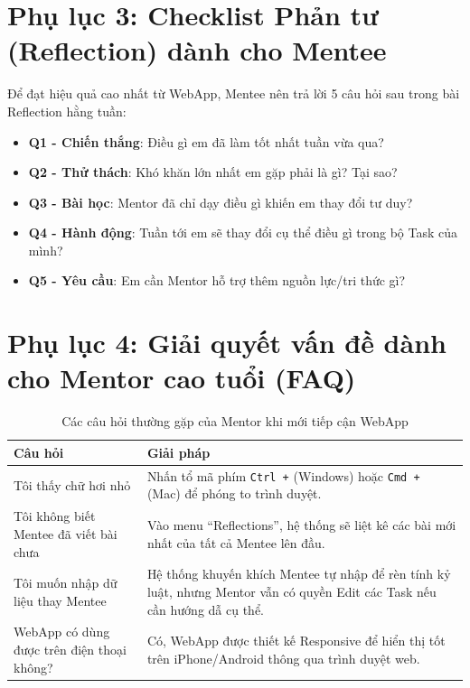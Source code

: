 \section*{Phụ lục 3: Checklist Phản tư (Reflection) dành cho Mentee}

Để đạt hiệu quả cao nhất từ WebApp, Mentee nên trả lời 5 câu hỏi sau trong bài Reflection hằng tuần:
\begin{itemize}
    \item \textbf{Q1 - Chiến thắng}: Điều gì em đã làm tốt nhất tuần vừa qua?
    \item \textbf{Q2 - Thử thách}: Khó khăn lớn nhất em gặp phải là gì? Tại sao?
    \item \textbf{Q3 - Bài học}: Mentor đã chỉ dạy điều gì khiến em thay đổi tư duy?
    \item \textbf{Q4 - Hành động}: Tuần tới em sẽ thay đổi cụ thể điều gì trong bộ Task của mình?
    \item \textbf{Q5 - Yêu cầu}: Em cần Mentor hỗ trợ thêm nguồn lực/tri thức gì?
\end{itemize}

\section*{Phụ lục 4: Giải quyết vấn đề dành cho Mentor cao tuổi (FAQ)}

\begin{table}[H]
    \centering
    \begin{tabularx}{\textwidth}{|L|L|}
    \hline
     \textbf{\color{white} Câu hỏi} & \textbf{\color{white} Giải pháp} \\ \hline
    Tôi thấy chữ hơi nhỏ & Nhấn tổ mã phím \texttt{Ctrl +} (Windows) hoặc \texttt{Cmd +} (Mac) để phóng to trình duyệt. \\ \hline
    Tôi không biết Mentee đã viết bài chưa & Vào menu ``Reflections'', hệ thống sẽ liệt kê các bài mới nhất của tất cả Mentee lên đầu. \\ \hline
    Tôi muốn nhập dữ liệu thay Mentee & Hệ thống khuyến khích Mentee tự nhập để rèn tính kỷ luật, nhưng Mentor vẫn có quyền Edit các Task nếu cần hướng dẫ cụ thể. \\ \hline
    WebApp có dùng được trên điện thoại không? & Có, WebApp được thiết kế Responsive để hiển thị tốt trên iPhone/Android thông qua trình duyệt web. \\ \hline
    \end{tabularx}
    \caption{Các câu hỏi thường gặp của Mentor khi mới tiếp cận WebApp}
\end{table}

